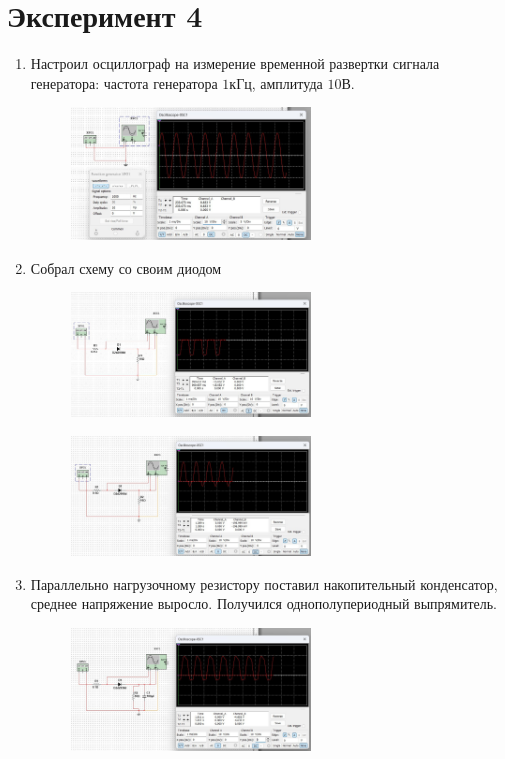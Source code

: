 \chapter{Эксперимент 4}

\begin{enumerate}
	\item Настроил осциллограф на измерение временной развертки сигнала
	генератора: частота генератора $1$кГц, амплитуда $10$В.
	\begin{figure}[H]
		\centering
		\includegraphics[width=0.6\textwidth]{img/24.jpg}
	\end{figure}
	
	\item Собрал схему со своим диодом
	\begin{figure}[H]
		\centering
		\includegraphics[width=0.6\textwidth]{img/25.jpg}
	\end{figure}
	
	\begin{figure}[H]
		\centering
		\includegraphics[width=0.6\textwidth]{img/26.jpg}
	\end{figure}
	\newpage
	\item Параллельно нагрузочному резистору поставил накопительный конденсатор,
	среднее напряжение выросло. Получился однополупериодный выпрямитель.
	\begin{figure}[H]
		\centering
		\includegraphics[width=0.6\textwidth]{img/27.jpg}
	\end{figure}
\end{enumerate}
